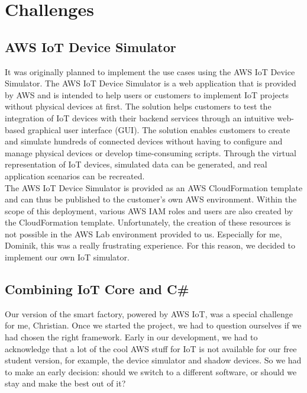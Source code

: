 \chapter{Challenges}

\section{AWS IoT Device Simulator}

It was originally planned to implement the use cases using the AWS IoT Device Simulator.
The AWS IoT Device Simulator is a web application that is provided by AWS and is intended to help users or customers to implement IoT projects without physical devices at first. 
The solution helps customers to test the integration of IoT devices with their backend services through an intuitive web-based graphical user interface (GUI).
The solution enables customers to create and simulate hundreds of connected devices without having to configure and manage physical devices or develop time-consuming scripts.
Through the virtual representation of IoT devices, simulated data can be generated, and real application scenarios can be recreated.\\

The AWS IoT Device Simulator is provided as an AWS CloudFormation template and can thus be published to the customer's own AWS environment.
Within the scope of this deployment, various AWS IAM roles and users are also created by the CloudFormation template.
Unfortunately, the creation of these resources is not possible in the AWS Lab environment provided to us.
Especially for me, Dominik, this was a really frustrating experience.
For this reason, we decided to implement our own IoT simulator.

\section{Combining IoT Core and C\#}

Our version of the smart factory, powered by AWS IoT, was a special challenge for me, Christian.
Once we started the project, we had to question ourselves if we had chosen the right framework.
Early in our development, we had to acknowledge that a lot of the cool AWS stuff for IoT is not available for our free student version, for example, the device simulator and shadow devices.
So we had to make an early decision: should we switch to a different software, or should we stay and make the best out of it?

